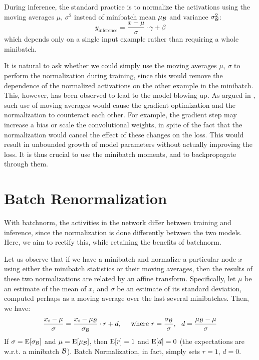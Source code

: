 During inference, the standard practice is to normalize the activations using the moving averages $\mu$, $\sigma^2$ instead of minibatch mean $\mu_{\mathcal{B}}$ and variance $\sigma_{\mathcal{B}}^2$:
$$
y_\text{inference} = \frac{x-\mu}{\sigma}\cdot \gamma + \beta
$$
which depends only on a single input example rather than requiring a whole minibatch. 

It is natural to ask whether we could simply use the moving averages $\mu$, $\sigma$ to perform the normalization during training, since this would remove the dependence of the normalized activations on the other example in the minibatch. This, however, has been observed to lead to the model blowing up. As argued in \cite{batchnorm}, such use of moving averages would cause the gradient optimization and the normalization to counteract each other. For example, the gradient step may increase a bias or scale the convolutional weights, in spite of the fact that the normalization would cancel the effect of these changes on the loss. This would result in unbounded growth of model parameters without actually improving the loss. It is thus crucial to use the minibatch moments, and to backpropagate through them.

\section{Batch Renormalization}

With batchnorm, the activities in the network differ between training and inference, since the normalization is done differently between the two models. Here, we aim to rectify this, while retaining  the benefits of batchnorm.

Let us observe that if we have a minibatch and normalize a particular node  $x$ using either the minibatch statistics or their moving averages, then the results of these two normalizations are related by an affine transform. 
Specifically, let $\mu$ be an estimate of the mean of $x$, and $\sigma$ be an estimate of its standard deviation, computed perhaps as a moving average over the last several minibatches. Then, we have:
$$
\frac{x_i-\mu}{\sigma} = \frac{x_i-\mu_{\mathcal{B}}}{\sigma_{\mathcal{B}}} \cdot r + d,\ \ \ \ \text{where $ r = \frac{\sigma_{\mathcal{B}}}{\sigma}, \ \  d = \frac{\mu_{\mathcal{B}}-\mu}{\sigma}$}
$$
If  $\sigma = \mathrm{E}[\sigma_{\mathcal{B}}]$ and $\mu=\mathrm{E}[\mu_{\mathcal{B}}]$, then $\mathrm{E}[r] = 1$ and $\mathrm{E}[d] = 0$  (the expectations are w.r.t. a minibatch $\mathcal{B}$). Batch Normalization, in fact, simply sets $r=1$, $d=0$. 

